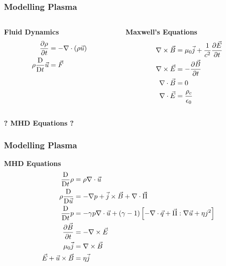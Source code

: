 \documentclass{beamer}
\newcommand{\DD}{\text{D}}
\begin{document}
\begin{frame}
\frametitle{Modelling Plasma}

    \begin{columns}[T]
        \begin{column}{.5\textwidth}
            \textbf{Fluid Dynamics}
            \begin{align*}
                \pdv{\rho}{t} &= -\nabla \cdot (\rho \vec{u}) \\
                \rho \frac{\DD}{\DD t} \vec{u} &= \vec{F}
            \end{align*}
        \end{column}

        \begin{column}{.5\textwidth}
            \textbf{Maxwell's Equations}
            \begin{align*}
                \nabla \times \vec{B} &= \mu_0 \vec{j} + \frac{1}{c^2} \pdv{\vec{E}}{t} \\
                \nabla \times \vec{E} &= -\pdv{\vec{B}}{t} \\
                \nabla \cdot \vec{B} &= 0 \\
                \nabla \cdot \vec{E} &= \frac{\rho_c}{\epsilon_0}
            \end{align*}
        \end{column}
    \end{columns}

    \begin{center}
        \textbf{? MHD Equations ?}
    \end{center}

\end{frame}










\begin{frame}
\frametitle{Modelling Plasma}


    \textbf{MHD Equations}
    \begin{align*}
        \frac{\DD}{\DD t} \rho &= \rho \nabla \cdot \vec{u} \\
        \rho \frac{\DD}{\DD \vec{u}} &= -\nabla p + \vec{j} \times \vec{B} + \nabla \cdot \vec{\Pi} \\
        \frac{\DD}{\DD t} p &= -\gamma p \nabla \cdot \vec{u} + (\gamma - 1) \left [ -\nabla \cdot \vec{q} + \vec{\Pi} : \nabla \vec{u} + \eta j^2 \right ] \\
        \pdv{\vec{B}}{t} &= -\nabla \times \vec{E} \\
        \mu_0 \vec{j} &= \nabla \times \vec{B} \\
        \vec{E} + \vec{u} \times \vec{B} &= \eta \vec{j}
    \end{align*}

\end{frame}
\end{document}
